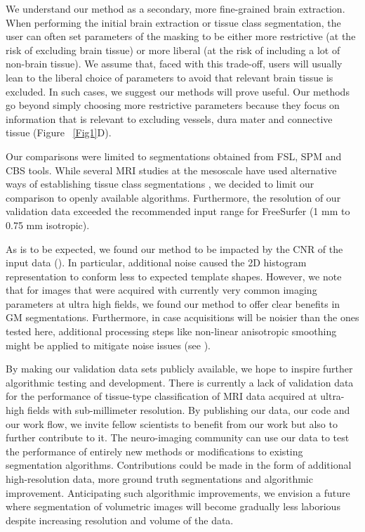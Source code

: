 We understand our method as a secondary, more fine-grained brain extraction. When performing the initial brain extraction or tissue class segmentation, the user can often set parameters of the masking to be either more restrictive (at the risk of excluding brain tissue) or more liberal (at the risk of including a lot of non-brain tissue). We assume that, faced with this trade-off, users will usually lean to the liberal choice of parameters to avoid that relevant brain tissue is excluded. In such cases, we suggest our methods will prove useful. Our methods go beyond simply choosing more restrictive parameters because they focus on information that is relevant to excluding vessels, dura mater and connective tissue (Figure ~\ref{Fig1}D).

Our comparisons were limited to segmentations obtained from FSL, SPM and CBS tools. While several MRI studies at the mesoscale have used alternative ways of establishing tissue class segmentations \parencite{Fischl2004, Goebel2006}, we decided to limit our comparison to openly available algorithms. Furthermore, the resolution of our validation data exceeded the recommended input range for FreeSurfer (1 mm to 0.75 mm isotropic).

As is to be expected, we found our method to be impacted by the CNR of the input data (). In particular, additional noise caused the 2D histogram representation to conform less to expected template shapes. However, we note that for images that were acquired with currently very common imaging parameters at ultra high fields, we found our method to offer clear benefits in GM segmentations. Furthermore, in case acquisitions will be noisier than the ones tested here, additional processing steps like non-linear anisotropic smoothing \parencite{Weickert1998, Mirebeau2015} might be applied to mitigate noise issues (see ).

By making our validation data sets publicly available, we hope to inspire further algorithmic testing and development. There is currently a lack of validation data for the performance of tissue-type classification of MRI data acquired at ultra-high fields with sub-millimeter resolution. By publishing our data, our code and our work flow, we invite fellow scientists to benefit from our work but also to further contribute to it. The neuro-imaging community can use our data to test the performance of entirely new methods or modifications to existing segmentation algorithms. Contributions could be made in the form of additional high-resolution data, more ground truth segmentations and algorithmic improvement. Anticipating such algorithmic improvements, we envision a future where segmentation of volumetric images will become gradually less laborious despite increasing resolution and volume of the data.

